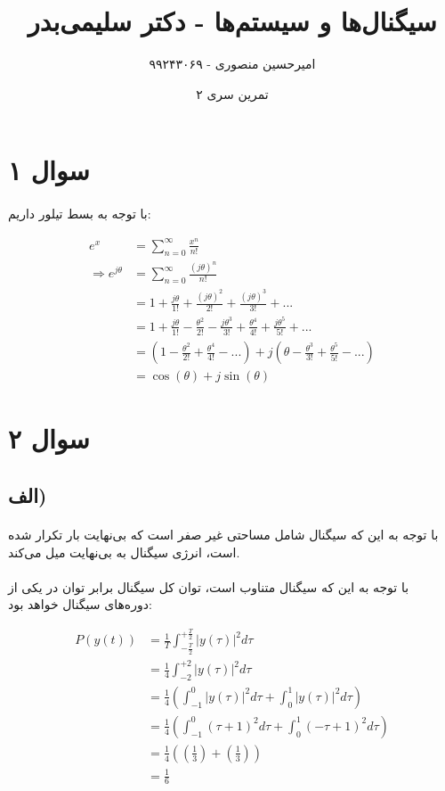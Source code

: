 \documentclass{article}
\title{سیگنال‌ها و سیستم‌ها - دکتر سلیمی‌بدر}
\author{امیرحسین منصوری - ۹۹۲۴۳۰۶۹}
\date{تمرین سری ۲}
\begin{document}
	\maketitle

	\section*{سوال ۱}
	\paragraph*{}
	با توجه به بسط تیلور داریم:

	\begin{align*}
		e^x &= \sum_{n = 0}^{\infty} \frac{x^n}{n!} \\
		\Rightarrow
		e^{j \theta} &= \sum_{n = 0}^{\infty} \frac{(j \theta)^n}{n!} \\
		&= 1 + \frac{j \theta}{1!} + \frac{(j \theta)^2}{2!} + \frac{(j \theta)^3}{3!}
		+ ... \\
		&= 1 + \frac{j \theta}{1!}
		- \frac{\theta ^ 2}{2!}
		- \frac{j \theta ^ 3}{3!}
		+ \frac{\theta ^ 4}{4!}
		+ \frac{j \theta ^ 5}{5!}
		+ ... \\
		&= \left(1 - \frac{\theta ^ 2}{2!} + \frac{\theta ^ 4}{4!} - ...\right)
		+ j\left(\theta - \frac{\theta ^ 3}{3!} + \frac{\theta ^ 5}{5!} - ...\right) \\
		&= \cos(\theta) + j \sin(\theta)
	\end{align*}

	\section*{سوال ۲}
	\subsection*{الف)}
	\paragraph*{}
	با توجه به این که سیگنال شامل مساحتی غیر صفر است که بی‌نهایت بار تکرار شده است، انرژی سیگنال به بی‌نهایت میل می‌کند.

	\paragraph*{}
	با توجه به این که سیگنال متناوب است، توان کل سیگنال برابر توان در یکی از دوره‌های سیگنال خواهد بود:

	\allowdisplaybreaks
	\begin{align*}
		P(y(t)) &= \frac{1}{T} \int_{-\frac{T}{2}}^{+\frac{T}{2}} \left|y(\tau)\right|^2 d \tau \\
		&= \frac{1}{4} \int_{-2}^{+2} \left|y(\tau)\right|^2 d \tau \\
		&= \frac{1}{4} \left( \int_{-1}^{0} \left| y(\tau)\right|^2 d \tau
		+ \int_{0}^{1} \left|y(\tau)\right|^2 d \tau \right)\\
		&= \frac{1}{4} \left( \int_{-1}^{0} (\tau+1)^2 d \tau
		+ \int_{0}^{1} (-\tau+1)^2 d \tau \right) \\
		&= \frac{1}{4} \left((\frac{1}{3}) + (\frac{1}{3})\right) \\
		&= \frac{1}{6}
	\end{align*}
\end{document}
